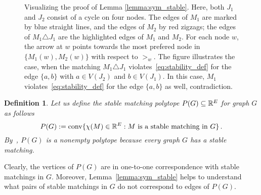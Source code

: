 \documentclass[3p,times]{elsarticle}
\newtheorem{definition}[fact]{Definition}
\DeclareMathOperator{\convOp}{conv}
\newcommand{\conv}{\convOp}
\begin{document}
\begin{figure}[H]
\caption{Visualizing the proof of Lemma \ref{lemma:sym_stable}.  Here, both $J_1$ and $J_2$ consist of a cycle on four nodes. The edges of $M_1$ are marked by blue straight lines, and the edges of $M_2$ by red zigzags; the edges of $M_1\triangle J_1$ are the highlighted edges of $M_1$ and $M_2$. For each node $w$, the arrow at $w$ points towards the most prefered node in $\{M_1(w), M_2(w)\}$ with respect to $>_w$.
The figure illustrates the case, when the matching $M_1\triangle J_1$ violates~\eqref{eq:stability_def} for the edge $\{a,b\}$ with $a\in V(J_2)$
  and $b\in V(J_1)$. In this case, $M_1$ violates~\eqref{eq:stability_def} for the edge $\{a,b\}$ as well, contradiction.}
\label{fig:sym_stable}
\end{figure}


\begin{definition}Let us define the \emph{stable matching polytope} $P(G)\subseteq\mathbb{R}^E$ for graph $G$ as follows
$$
	P(G):=\conv\{\chi(M)\in\R^E: M \text{ is a stable matching in } G\}\,.
$$
By~\cite{gale1962college}, $P(G)$ is a nonempty polytope because every
graph $G$ has a stable matching.
\end{definition}
Clearly, the vertices of $P(G)$ are in one-to-one correspondence with
stable matchings in $G$. Moreover, Lemma~\ref{lemma:sym_stable} helps
to understand what pairs of stable matchings in $G$ do not correspond
to edges of $P(G)$.
\end{document}
